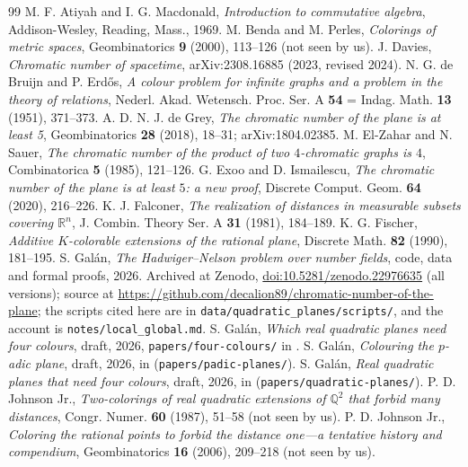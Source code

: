 \documentclass[11pt,a4paper]{amsart}
\theoremstyle{definition}
\newcommand{\Q}{\mathbb{Q}}
\newcommand{\R}{\mathbb{R}}
\begin{document}
\begin{thebibliography}{99}
 M. F. Atiyah and I. G. Macdonald, \emph{Introduction to commutative algebra}, Addison-Wesley,
Reading, Mass., 1969.
 M. Benda and M. Perles, \emph{Colorings of metric spaces}, Geombinatorics \textbf{9} (2000),
113--126 (not seen by us).
 J. Davies, \emph{Chromatic number of spacetime}, arXiv:2308.16885 (2023, revised 2024).
 N. G. de Bruijn and P. Erd\H{o}s, \emph{A colour problem for infinite graphs and a problem in the
theory of relations}, Nederl. Akad. Wetensch. Proc. Ser. A \textbf{54} = Indag. Math. \textbf{13} (1951),
371--373.
 A. D. N. J. de Grey, \emph{The chromatic number of the plane is at least 5}, Geombinatorics
\textbf{28} (2018), 18--31; arXiv:1804.02385.
 M. El-Zahar and N. Sauer, \emph{The chromatic number of the product of two $4$-chromatic graphs is
$4$}, Combinatorica \textbf{5} (1985), 121--126.
 G. Exoo and D. Ismailescu, \emph{The chromatic number of the plane is at least $5$: a new proof},
Discrete Comput. Geom. \textbf{64} (2020), 216--226.
 K. J. Falconer, \emph{The realization of distances in measurable subsets covering $\R^n$},
J. Combin. Theory Ser. A \textbf{31} (1981), 184--189.
 K. G. Fischer, \emph{Additive $K$-colorable extensions of the rational plane}, Discrete
Math. \textbf{82} (1990), 181--195.
 S. Gal\'an, \emph{The Hadwiger--Nelson problem over number fields}, code, data and formal
proofs, 2026. Archived at Zenodo, \href{https://doi.org/10.5281/zenodo.22976635}{doi:10.5281/zenodo.22976635}
(all versions); source at \url{https://github.com/decalion89/chromatic-number-of-the-plane}; the scripts cited here
are in \texttt{data/quadratic\_planes/scripts/}, and the account is \texttt{notes/local\_global.md}.
 S. Gal\'an, \emph{Which real quadratic planes need four colours}, draft, 2026,
\texttt{papers/four-colours/} in \cite{Repo}.
 S. Gal\'an, \emph{Colouring the $p$-adic plane}, draft, 2026, in \cite{Repo}
(\texttt{papers/padic-planes/}).
 S. Gal\'an, \emph{Real quadratic planes that need four colours}, draft, 2026, in \cite{Repo}
(\texttt{papers/quadratic-planes/}).
 P. D. Johnson Jr., \emph{Two-colorings of real quadratic extensions of $\Q^2$ that forbid
many distances}, Congr. Numer. \textbf{60} (1987), 51--58 (not seen by us).
 P. D. Johnson Jr., \emph{Coloring the rational points to forbid the distance one---a
tentative history and compendium}, Geombinatorics \textbf{16} (2006), 209--218 (not seen by us).

\end{thebibliography}
\end{document}

